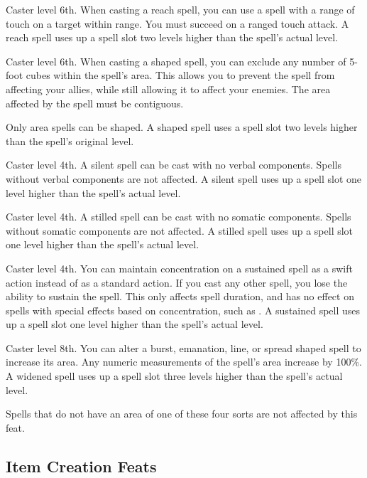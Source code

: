  Caster level 6th.
 When casting a reach spell, you can use a spell with a range of touch on a target within \rngclose range. You must succeed on a ranged touch attack. A reach spell uses up a spell slot two levels higher than the spell's actual level.

 Caster level 6th.
 When casting a shaped spell, you can exclude any number of 5-foot cubes within the spell's area. This allows you to prevent the spell from affecting your allies, while still allowing it to affect your enemies. The area affected by the spell must be contiguous.

Only area spells can be shaped. A shaped spell uses a spell slot two levels higher than the spell's original level.

 Caster level 4th.
 A silent spell can be cast with no verbal components. Spells without verbal components are not affected. A silent spell uses up a spell slot one level higher than the spell's actual level.

 Caster level 4th.
 A stilled spell can be cast with no somatic components. Spells without somatic components are not affected. A stilled spell uses up a spell slot one level higher than the spell's actual level.

\featpre Caster level 4th.
\featben You can maintain concentration on a sustained spell as a swift action instead of as a standard action. If you cast any other spell, you lose the ability to sustain the spell. This only affects spell duration, and has no effect on spells with special effects based on concentration, such as . A sustained spell uses up a spell slot one level higher than the spell's actual level.

 Caster level 8th.
 You can alter a burst, emanation, line, or spread shaped spell to increase its area. Any numeric measurements of the spell's area increase by 100\%. A widened spell uses up a spell slot three levels higher than the spell's actual level.
\par Spells that do not have an area of one of these four sorts are not affected by this feat.

\subsection{Item Creation Feats}

